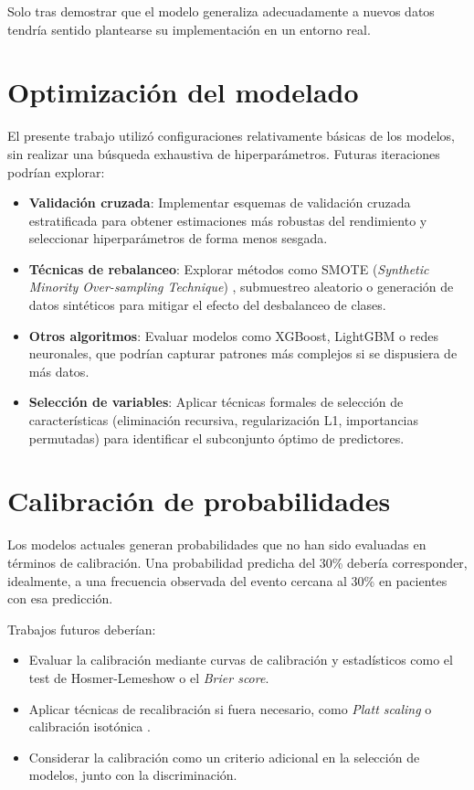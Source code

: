 \documentclass[12pt, a4paper, oneside]{report}
\begin{document}
Solo tras demostrar que el modelo generaliza adecuadamente a nuevos datos tendría sentido plantearse su implementación en un entorno real.

\section{Optimización del modelado}

El presente trabajo utilizó configuraciones relativamente básicas de los modelos, sin realizar una búsqueda exhaustiva de hiperparámetros. Futuras iteraciones podrían explorar:

\begin{itemize}
    \item \textbf{Validación cruzada}: Implementar esquemas de validación cruzada estratificada para obtener estimaciones más robustas del rendimiento y seleccionar hiperparámetros de forma menos sesgada.
    
    \item \textbf{Técnicas de rebalanceo}: Explorar métodos como SMOTE (\textit{Synthetic Minority Over-sampling Technique}) \cite{chawla2002smote}, submuestreo aleatorio o generación de datos sintéticos para mitigar el efecto del desbalanceo de clases.
    
    \item \textbf{Otros algoritmos}: Evaluar modelos como XGBoost, LightGBM o redes neuronales, que podrían capturar patrones más complejos si se dispusiera de más datos.
    
    \item \textbf{Selección de variables}: Aplicar técnicas formales de selección de características (eliminación recursiva, regularización L1, importancias permutadas) para identificar el subconjunto óptimo de predictores.
\end{itemize}

\section{Calibración de probabilidades}

Los modelos actuales generan probabilidades que no han sido evaluadas en términos de calibración. Una probabilidad predicha del 30\% debería corresponder, idealmente, a una frecuencia observada del evento cercana al 30\% en pacientes con esa predicción.

Trabajos futuros deberían:

\begin{itemize}
    \item Evaluar la calibración mediante curvas de calibración y estadísticos como el test de Hosmer-Lemeshow o el \textit{Brier score}.
    
    \item Aplicar técnicas de recalibración si fuera necesario, como \textit{Platt scaling} o calibración isotónica \cite{niculescu2005predicting}.
    
    \item Considerar la calibración como un criterio adicional en la selección de modelos, junto con la discriminación.
\end{itemize}
\end{document}
